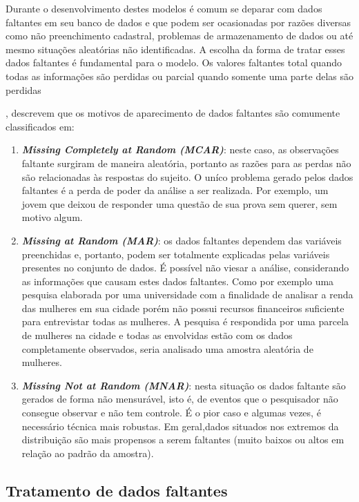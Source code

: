 \documentclass[
  openany]{book}
\begin{document}
Durante o desenvolvimento destes modelos é comum se deparar com dados faltantes em seu banco de dados e que podem ser ocasionadas por razões diversas como não preenchimento cadastral, problemas de armazenamento de dados ou até mesmo situações aleatórias não identificadas. A escolha da forma de tratar esses dados faltantes é fundamental para o modelo. Os valores faltantes total quando todas as informações são perdidas ou parcial quando somente uma parte delas são perdidas

\citep{little2019statistical}, descrevem que os motivos de aparecimento de dados faltantes são comumente classificados em:

\begin{enumerate}
\def\labelenumi{\arabic{enumi}.}
\item
  \textbf{\emph{Missing Completely at Random (MCAR)}}: neste caso, as observações faltante surgiram de maneira aleatória, portanto as razões para as perdas não são relacionadas às respostas do sujeito. O uníco problema gerado pelos dados faltantes é a perda de poder da análise a ser realizada. Por exemplo, um jovem que deixou de responder uma questão de sua prova sem querer, sem motivo algum.
\item
  \textbf{\emph{Missing at Random (MAR)}}: os dados faltantes dependem das variáveis preenchidas e, portanto, podem ser totalmente explicadas pelas variáveis presentes no conjunto de dados. É possível não viesar a análise, considerando as informações que causam estes dados faltantes. Como por exemplo uma pesquisa elaborada por uma universidade com a finalidade de analisar a renda das mulheres em sua cidade porém não possui recursos financeiros suficiente para entrevistar todas as mulheres. A pesquisa é respondida por uma parcela de mulheres na cidade e todas as envolvidas estão com os dados completamente observados, seria analisado uma amostra aleatória de mulheres.
\item
  \textbf{\emph{Missing Not at Random (MNAR)}}: nesta situação os dados faltante são gerados de forma não mensurável, isto é, de eventos que o pesquisador não consegue observar e não tem controle. É o pior caso e algumas vezes, é necessário técnica mais robustas. Em geral,dados situados nos extremos da distribuição são mais propensos a serem faltantes (muito baixos ou altos em relação ao padrão da amostra).
\end{enumerate}

\hypertarget{tratamento-de-dados-faltantes}{%
\subsection{Tratamento de dados faltantes}\label{tratamento-de-dados-faltantes}}
\end{document}
